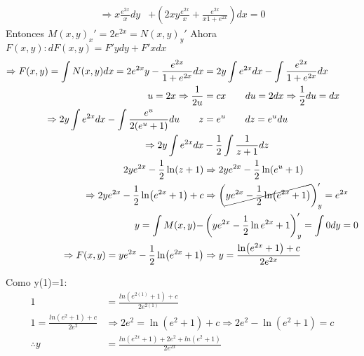 \begin{itemize}
\begin{align*}
        \Rightarrow x\frac{e^{2x}}{x} dy &+ \left(2xy \frac{e^{2x}}{x} + \frac{e^{2x}}{x1+e^{2x}}\right)dx=0
    \end{align*}
    Entonces $M(x,y)_x'=2e^{2x}=N(x,y)_y'$ \hspace{0.5cm}Ahora $F(x,y):dF(x,y)=F'ydy+F'xdx$
    \begin{align*}
        \Rightarrow F(x,y)=\int N(x,y)dx=2e^{2x}y-\frac{e^{2x}}{1+e^{2x}}dx &= 2y\int e^{2x}dx- \int \frac{e^{2x}}{1+e^{2x}}dx \\
        u=2x \Rightarrow \frac{1}{2u} &=cx \qquad du=2dx \Rightarrow \frac{1}{2}du=dx\\
        \Rightarrow 2y\int e^{2x} dx - \int \frac{e^u}{2(e^u+1)}du \qquad z &= e^u \qquad dz=e^udu\\
        \Rightarrow 2y\int e^{2x}dx &- \frac{1}{2}\int \frac{1}{z+1}dz\\
        2ye^{2x} - \frac{1}{2}\ln(z+1) &\Rightarrow 2ye^{2x}-\frac{1}{2}\ln (e^u+1)\\
        \Rightarrow 2ye^{2x}-\frac{1}{2}\ln (e^{2x}+1) +c &\Rightarrow \left(\cancel{ye^{2x}-\frac{1}{2}\ln(e^{2x}+1)}\right)_y'=e^{2x}\\
       y=\int M(x,y) - &\left(ye^{2x}-\frac{1}{2}\ln e^{2x} + 1\right)_y'= \int 0dy=0\\
     \Rightarrow F(x,y) = ye^{2x} - \frac{1}{2}\ln (e^{2x}+1) &\Rightarrow y=\frac{\ln (e^{2x}+1)+c}{2e^{2x}}
     \end{align*}
     
    Como y(1)=1:
    \begin{align*}
       1 &= \frac{ln(e^{2(1)}+1)+c}{2e^{2(1)}}\\
       1 = \frac{ln(e^2+1)+c}{2e^2} &\Rightarrow 2e^2=\ln(e^2+1) + c \Rightarrow 2e^2-\ln (e^2+1)=c\\
      \therefore y &= \frac{ln(e^{2x}+1)+ 2e^2 + ln(e^2+1)}{2e^{2x}} 
   \end{align*}
   

\end{itemize}
